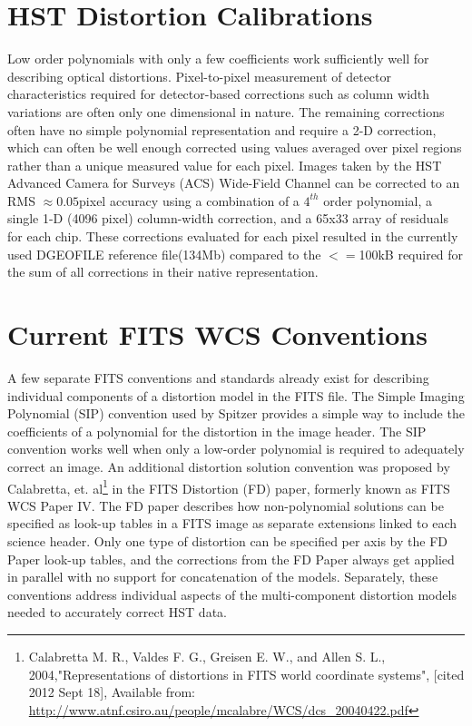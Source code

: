 \section{HST Distortion Calibrations}
Low order polynomials with only a few coefficients work sufficiently well for describing optical distortions. Pixel-to-pixel measurement of detector characteristics required for detector-based corrections such as column width variations are often only one dimensional in nature.  The remaining corrections often have no simple polynomial representation and require a 2-D correction, which can often be well enough corrected using values averaged over pixel regions rather than a unique measured value for each pixel. Images taken by the HST Advanced Camera for Surveys (ACS) Wide-Field Channel can be corrected to an RMS $\approx 0.05$pixel accuracy using a combination of a $4^{th}$ order polynomial, a single 1-D (4096 pixel) column-width correction, and a 65x33 array of residuals for each chip. These corrections evaluated for each pixel resulted in the currently used DGEOFILE reference file(134Mb) compared to the $<=$100kB required for the sum of all corrections in their native representation. 

\section{Current FITS WCS Conventions}
A few separate FITS conventions and standards already exist for describing individual components of a distortion model in the FITS file. The Simple Imaging Polynomial (SIP)\citep{shupe_2005} convention used by Spitzer provides a simple way to include the coefficients of a polynomial for the distortion in the image header. The SIP convention works well when only a low-order polynomial is required to adequately correct an image. An additional distortion solution convention was proposed by Calabretta, et. al\footnote{Calabretta M. R., Valdes F. G., Greisen E. W., and Allen S. L., 2004,"Representations of distortions in FITS world coordinate systems", [cited 2012 Sept 18], Available from: \url{http://www.atnf.csiro.au/people/mcalabre/WCS/dcs_20040422.pdf}} in the FITS Distortion (FD) paper, formerly known as FITS WCS Paper IV. The FD paper describes how non-polynomial solutions can be specified as look-up tables in a FITS image as separate extensions linked to each science header.  Only one type of distortion can be specified per axis by the FD Paper look-up tables, and the corrections from the FD Paper always get applied in parallel with no support for concatenation of the models.  Separately, these conventions address individual aspects of the multi-component distortion models needed to accurately correct HST data.

